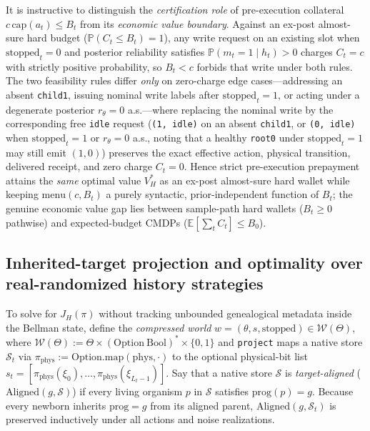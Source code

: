 \documentclass[11pt,a4paper]{article}
\begin{document}
It is instructive to distinguish the \emph{certification role} of
pre-execution collateral \(c\,\mathrm{cap}(a_t) \le B_t\) from its
\emph{economic value boundary}. Against an ex-post almost-sure hard
budget (\(\mathbb{P}(C_t \le B_t) = 1\)), any write request on an
existing slot when \(\mathrm{stopped}_t = 0\) and posterior reliability
satisfies \(\mathbb{P}(m_t = 1 \mid h_t) > 0\) charges \(C_t = c\) with
strictly positive probability, so \(B_t < c\) forbids that write under
both rules. The two feasibility rules differ \emph{only} on zero-charge
edge cases---addressing an absent \texttt{child1}, issuing nominal write
labels after \(\mathrm{stopped}_t = 1\), or acting under a degenerate
posterior \(r_\theta = 0\) a.s.---where replacing the nominal write by
the corresponding free \texttt{idle} request (\texttt{(1,\ idle)} on an
absent \texttt{child1}, or \texttt{(0,\ idle)} when
\(\mathrm{stopped}_t = 1\) or \(r_\theta = 0\) a.s., noting that a
healthy \texttt{root0} under \(\mathrm{stopped}_t = 1\) may still emit
\((1,0)\)) preserves the exact effective action, physical transition,
delivered receipt, and zero charge \(C_t = 0\). Hence strict
pre-execution prepayment attains the \emph{same} optimal value \(V_H^*\)
as an ex-post almost-sure hard wallet while keeping
\(\mathrm{menu}(c, B_t)\) a purely syntactic, prior-independent function
of \(B_t\); the genuine economic value gap lies between sample-path hard
wallets (\(B_t \ge 0\) pathwise) and expected-budget CMDPs
(\(\mathbb{E}[\sum_t C_t] \le B_0\)).

\subsection{Inherited-target projection and optimality over
real-randomized history
strategies}\label{inherited-target-projection-and-optimality-over-real-randomized-history-strategies}

To solve for \(J_H(\pi)\) without tracking unbounded genealogical
metadata inside the Bellman state, define the \emph{compressed world}
\(w = (\theta, s, \mathrm{stopped}) \in \mathcal{W}(\Theta)\), where
\(\mathcal{W}(\Theta) := \Theta \times (\mathrm{Option\ Bool})^* \times \{0,1\}\)
and \texttt{project} maps a native store \(\mathcal{S}_t\) via
\(\pi_{\mathrm{phys}} := \mathrm{Option.map}(\mathrm{phys}, \cdot)\) to
the optional physical-bit list
\(s_t = [\pi_{\mathrm{phys}}(\xi_0), \dots, \pi_{\mathrm{phys}}(\xi_{L_t-1})]\).
Say that a native store \(\mathcal{S}\) is \emph{target-aligned}
(\(\mathrm{Aligned}(g, \mathcal{S})\)) if every living organism \(p\) in
\(\mathcal{S}\) satisfies \(\mathrm{prog}(p) = g\). Because every
newborn inherits \(\mathrm{prog} = g\) from its aligned parent,
\(\mathrm{Aligned}(g, \mathcal{S}_t)\) is preserved inductively under
all actions and noise realizations.
\end{document}
